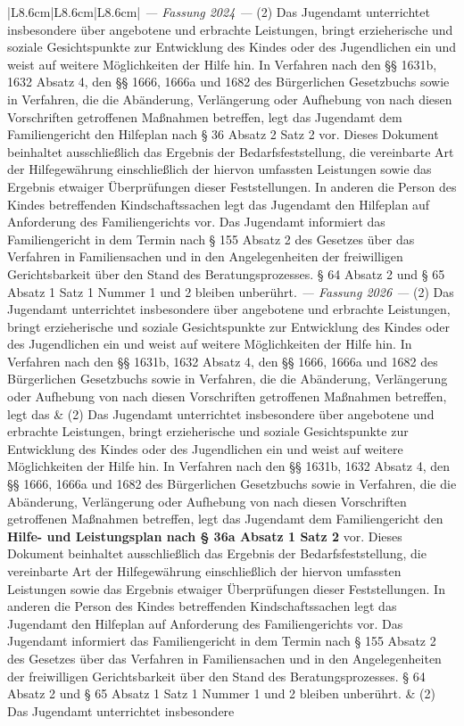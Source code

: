 \documentclass[10pt,a4paper,landscape]{article}
\begin{document}
\begin{longtable}{|L{8.6cm}|L{8.6cm}|L{8.6cm}|}
\textit{--- Fassung 2024 ---} \newline (2) Das Jugendamt unterrichtet insbesondere über angebotene und erbrachte Leistungen, bringt erzieherische und soziale Gesichtspunkte zur Entwicklung des Kindes oder des Jugendlichen ein und weist auf weitere Möglichkeiten der Hilfe hin. In Verfahren nach den \S{}\S{} 1631b, 1632 Absatz 4, den \S{}\S{} 1666, 1666a und 1682 des Bürgerlichen Gesetzbuchs sowie in Verfahren, die die Abänderung, Verlängerung oder Aufhebung von nach diesen Vorschriften getroffenen Maßnahmen betreffen, legt das Jugendamt dem Familiengericht den Hilfeplan nach \S{} 36 Absatz 2 Satz 2 vor. Dieses Dokument beinhaltet ausschließlich das Ergebnis der Bedarfsfeststellung, die vereinbarte Art der Hilfegewährung einschließlich der hiervon umfassten Leistungen sowie das Ergebnis etwaiger Überprüfungen dieser Feststellungen. In anderen die Person des Kindes betreffenden Kindschaftssachen legt das Jugendamt den Hilfeplan auf Anforderung des Familiengerichts vor. Das Jugendamt informiert das Familiengericht in dem Termin nach \S{} 155 Absatz 2 des Gesetzes über das Verfahren in Familiensachen und in den Angelegenheiten der freiwilligen Gerichtsbarkeit über den Stand des Beratungsprozesses. \S{} 64 Absatz 2 und \S{} 65 Absatz 1 Satz 1 Nummer 1 und 2 bleiben unberührt. \newline \textit{--- Fassung 2026 ---} \newline (2) Das Jugendamt unterrichtet insbesondere über angebotene und erbrachte Leistungen, bringt erzieherische und soziale Gesichtspunkte zur Entwicklung des Kindes oder des Jugendlichen ein und weist auf weitere Möglichkeiten der Hilfe hin. In Verfahren nach den \S{}\S{} 1631b, 1632 Absatz 4, den \S{}\S{} 1666, 1666a und 1682 des Bürgerlichen Gesetzbuchs sowie in Verfahren, die die Abänderung, Verlängerung oder Aufhebung von nach diesen Vorschriften getroffenen Maßnahmen betreffen, legt das & (2) Das Jugendamt unterrichtet insbesondere über angebotene und erbrachte Leistungen, bringt erzieherische und soziale Gesichtspunkte zur Entwicklung des Kindes oder des Jugendlichen ein und weist auf weitere Möglichkeiten der Hilfe hin. In Verfahren nach den \S{}\S{} 1631b, 1632 Absatz 4, den \S{}\S{} 1666, 1666a und 1682 des Bürgerlichen Gesetzbuchs sowie in Verfahren, die die Abänderung, Verlängerung oder Aufhebung von nach diesen Vorschriften getroffenen Maßnahmen betreffen, legt das Jugendamt dem Familiengericht den \textbf{Hilfe- und Leistungsplan nach \S{} 36a Absatz 1 Satz 2} vor. Dieses Dokument beinhaltet ausschließlich das Ergebnis der Bedarfsfeststellung, die vereinbarte Art der Hilfegewährung einschließlich der hiervon umfassten Leistungen sowie das Ergebnis etwaiger Überprüfungen dieser Feststellungen. In anderen die Person des Kindes betreffenden Kindschaftssachen legt das Jugendamt den Hilfeplan auf Anforderung des Familiengerichts vor. Das Jugendamt informiert das Familiengericht in dem Termin nach \S{} 155 Absatz 2 des Gesetzes über das Verfahren in Familiensachen und in den Angelegenheiten der freiwilligen Gerichtsbarkeit über den Stand des Beratungsprozesses. \S{} 64 Absatz 2 und \S{} 65 Absatz 1 Satz 1 Nummer 1 und 2 bleiben unberührt. & (2) Das Jugendamt unterrichtet insbesondere 
\end{longtable}
\end{document}
